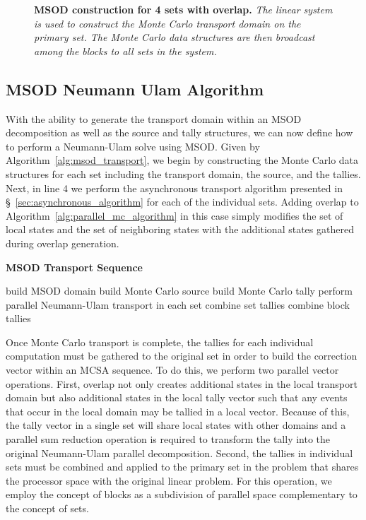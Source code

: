 \clearpage

\begin{figure}[t!]
  \begin{center}
    \scalebox{0.55}{  }
  \end{center}
  \caption{\textbf{MSOD construction for 4 sets with overlap.}
    \textit{The linear system is used to construct the Monte Carlo
      transport domain on the primary set. The Monte Carlo data
      structures are then broadcast among the blocks to all sets in
      the system.}}
  \label{fig:msod_construction}
\end{figure}

\subsection{MSOD Neumann Ulam Algorithm }
\label{subsec:msod_algorithm}

With the ability to generate the transport domain within an MSOD
decomposition as well as the source and tally structures, we can now
define how to perform a Neumann-Ulam solve using MSOD. Given by
Algorithm~\ref{alg:msod_transport}, we begin by constructing the Monte
Carlo data structures for each set including the transport domain, the
source, and the tallies. Next, in line 4 we perform the asynchronous
transport algorithm presented in \S~\ref{sec:asynchronous_algorithm}
for each of the individual sets. Adding overlap to
Algorithm~\ref{alg:parallel_mc_algorithm} in this case simply modifies
the set of local states and the set of neighboring states with the
additional states gathered during overlap generation.

\begin{algorithm}[h!]
  \caption{\textbf{MSOD Transport Sequence}}
  \label{alg:msod_transport}
  \begin{algorithmic}[1]
    \State build MSOD domain
    \State build Monte Carlo source
    \State build Monte Carlo tally
    \State perform parallel Neumann-Ulam transport in each set
    \State combine set tallies
    \State combine block tallies
  \end{algorithmic}
\end{algorithm}

Once Monte Carlo transport is complete, the tallies for each
individual computation must be gathered to the original set in order
to build the correction vector within an MCSA sequence. To do this, we
perform two parallel vector operations. First, overlap not only
creates additional states in the local transport domain but also
additional states in the local tally vector such that any events that
occur in the local domain may be tallied in a local vector. Because of
this, the tally vector in a single set will share local states with
other domains and a parallel sum reduction operation is required to
transform the tally into the original Neumann-Ulam parallel
decomposition. Second, the tallies in individual sets must be combined
and applied to the primary set in the problem that shares the
processor space with the original linear problem. For this operation,
we employ the concept of blocks as a subdivision of parallel space
complementary to the concept of sets.

